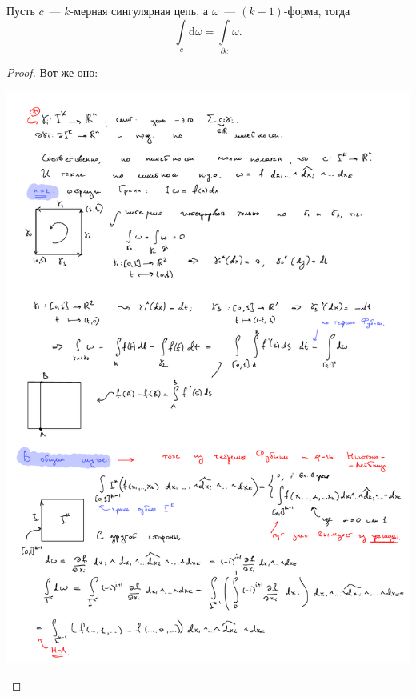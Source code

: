 	\begin{theorem}[Стокс] 
		Пусть $c$~--- $k$-мерная сингулярная цепь, а $\omega$~--- $(k - 1)$-форма, тогда 
		\[
			\int\limits_{c} \mathrm{d}\omega = \int\limits_{\partial c} \omega.
		\]
	\end{theorem}
	\begin{proof} Вот же оно:
		\begin{center}
			\includegraphics[scale = 0.55]{lectures/7/pictures/Stonks_formula.pdf}
		\end{center}
	\end{proof}

